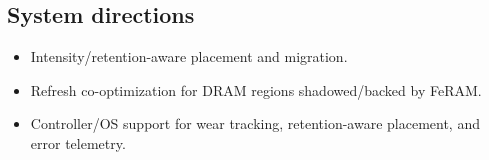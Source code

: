 \subsection*{System directions}
\begin{itemize}
  \item Intensity/retention-aware placement and migration.
  \item Refresh co-optimization for DRAM regions shadowed/backed by FeRAM.
  \item Controller/OS support for wear tracking, retention-aware placement, and error telemetry.
\end{itemize}

